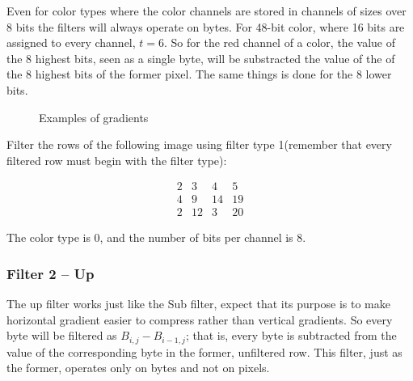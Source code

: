 Even for color types where the color channels are stored in channels
of sizes over $8$ bits the filters will always operate on bytes. For
48-bit color, where 16 bits are assigned to every channel, $t=6$. So
for the red channel of a color, the value of the 8 highest bits, seen
as a single byte, will be substracted the value of the of the 8
highest bits of the former pixel. The same things is done for the 8
lower bits.

\begin{figure}[h!]
  \centering


  \caption{Examples of gradients}
\end{figure}

\begin{Exercise}[label={filter-1}]

  Filter the rows of the following image using filter type 1(remember
  that every filtered row must begin with the filter type):

\[
 \begin{matrix}
  2 & 3 & 4 & 5 \\
  4 & 9 & 14 & 19 \\
  2 & 12 & 3 & 20
 \end{matrix}
\]

The color type is $0$, and the number of bits per channel is $8$.


\end{Exercise}

\subsubsection{Filter 2 -- Up}

The up filter works just like the Sub filter, expect that its purpose
is to make horizontal gradient easier to compress rather than vertical
gradients. So every byte will be filtered as $B_{i,j} - B_{i-1,j}$;
that is, every byte is subtracted from the value of the corresponding
byte in the former, unfiltered row. This filter, just as the former,
operates only on bytes and not on pixels.

